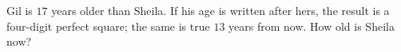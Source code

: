 Gil is $17$ years older than Sheila. If his age is written after hers, the result is a four-digit perfect square; the same is true $13$ years from now. How old is Sheila now?
